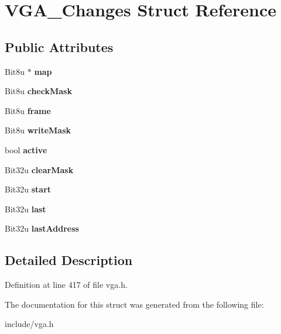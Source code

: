\hypertarget{structVGA__Changes}{\section{V\-G\-A\-\_\-\-Changes Struct Reference}
\label{structVGA__Changes}
}
\subsection*{Public Attributes}
\begin{DoxyCompactItemize}
\item 
\hypertarget{structVGA__Changes_aae6472354347c41048cfab1219789b64}{Bit8u $\ast$ {\bfseries map}}\label{structVGA__Changes_aae6472354347c41048cfab1219789b64}

\item 
\hypertarget{structVGA__Changes_a6ae67831c523b25bdc21fa4db83afe43}{Bit8u {\bfseries check\-Mask}}\label{structVGA__Changes_a6ae67831c523b25bdc21fa4db83afe43}

\item 
\hypertarget{structVGA__Changes_ac26763f63772c078c7743773f53cde98}{Bit8u {\bfseries frame}}\label{structVGA__Changes_ac26763f63772c078c7743773f53cde98}

\item 
\hypertarget{structVGA__Changes_ad700dfb8efd57be98a89c9204d4af2f7}{Bit8u {\bfseries write\-Mask}}\label{structVGA__Changes_ad700dfb8efd57be98a89c9204d4af2f7}

\item 
\hypertarget{structVGA__Changes_a5e1eb3db4e0041fcaa05d426cf0bcf7b}{bool {\bfseries active}}\label{structVGA__Changes_a5e1eb3db4e0041fcaa05d426cf0bcf7b}

\item 
\hypertarget{structVGA__Changes_a64765a10e9ca419e7fe12ad0cd73f297}{Bit32u {\bfseries clear\-Mask}}\label{structVGA__Changes_a64765a10e9ca419e7fe12ad0cd73f297}

\item 
\hypertarget{structVGA__Changes_adcb1b4110d1643ca21b047ff682124b5}{Bit32u {\bfseries start}}\label{structVGA__Changes_adcb1b4110d1643ca21b047ff682124b5}

\item 
\hypertarget{structVGA__Changes_af476a9d8e176d26e02c9297300ed8baf}{Bit32u {\bfseries last}}\label{structVGA__Changes_af476a9d8e176d26e02c9297300ed8baf}

\item 
\hypertarget{structVGA__Changes_a65c792a3ddf72b6a016b3b221857f3b7}{Bit32u {\bfseries last\-Address}}\label{structVGA__Changes_a65c792a3ddf72b6a016b3b221857f3b7}

\end{DoxyCompactItemize}


\subsection{Detailed Description}


Definition at line 417 of file vga.\-h.



The documentation for this struct was generated from the following file\-:\begin{DoxyCompactItemize}
\item 
include/vga.\-h\end{DoxyCompactItemize}
